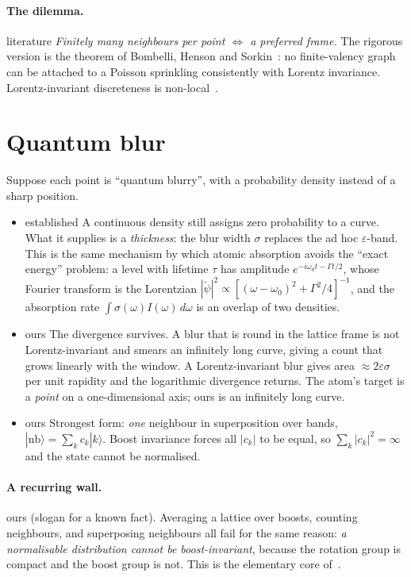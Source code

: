 \documentclass[11pt,a4paper]{article}
\newcommand{\tagbox}[2]{\textsf{\scriptsize\colorbox{#1!12}{\textcolor{#1!70!black}{#2}}}}
\newcommand{\est}{\tagbox{gray}{established}}
\newcommand{\lit}{\tagbox{blue}{literature}}
\newcommand{\ours}{\tagbox{orange}{ours}}
\begin{document}
\paragraph{The dilemma.} \lit{} \emph{Finitely many neighbours per point $\Leftrightarrow$ a preferred frame.} The rigorous version is the theorem of Bombelli, Henson and Sorkin~\cite{BHS06}: no finite-valency graph can be attached to a Poisson sprinkling consistently with Lorentz invariance. Lorentz-invariant discreteness is non-local~\cite{Sorkin07}.

\section{Quantum blur}
Suppose each point is ``quantum blurry'', with a probability density instead of a sharp position.
\begin{itemize}[leftmargin=*]
\item \est{} A continuous density still assigns zero probability to a curve. What it supplies is a \emph{thickness}: the blur width $\sigma$ replaces the ad hoc $\varepsilon$-band. This is the same mechanism by which atomic absorption avoids the ``exact energy'' problem: a level with lifetime $\tau$ has amplitude $e^{-i\omega_0t-\Gamma t/2}$, whose Fourier transform is the Lorentzian $|\tilde\psi|^2\propto[(\omega-\omega_0)^2+\Gamma^2/4]^{-1}$, and the absorption rate $\int\sigma(\omega)I(\omega)\,d\omega$ is an overlap of two densities.
\item \ours{} The divergence survives. A blur that is round in the lattice frame is not Lorentz-invariant and smears an infinitely long curve, giving a count that grows linearly with the window. A Lorentz-invariant blur gives area $\approx2\varepsilon\sigma$ per unit rapidity and the logarithmic divergence returns. The atom's target is a \emph{point} on a one-dimensional axis; ours is an infinitely long curve.
\item \ours{} Strongest form: \emph{one} neighbour in superposition over bands, $|\mathrm{nb}\rangle=\sum_kc_k|k\rangle$. Boost invariance forces all $|c_k|$ to be equal, so $\sum_k|c_k|^2=\infty$ and the state cannot be normalised.
\end{itemize}

\paragraph{A recurring wall.} \ours{} (slogan for a known fact). Averaging a lattice over boosts, counting neighbours, and superposing neighbours all fail for the same reason: \emph{a normalisable distribution cannot be boost-invariant}, because the rotation group is compact and the boost group is not. This is the elementary core of~\cite{BHS06}.
\end{document}
